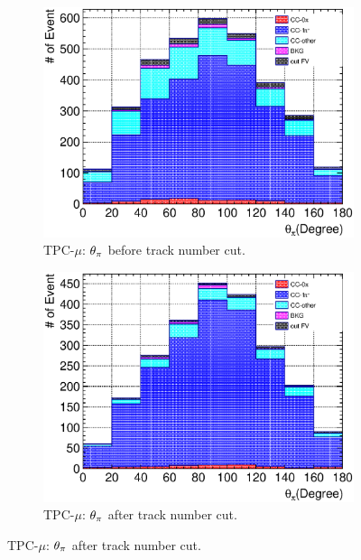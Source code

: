 \begin{figure}
\begin{subfigure}[!htb]{\dbfigwid\textwidth}
             \end{subfigure}
             \\
             \begin{subfigure}[!htb]{\dbfigwid\textwidth}
                  \includegraphics[width=\textwidth]{figures/sel/TPCmu_theta_pi_stack_al8.eps}
                  \caption{TPC-$\mu$: $\theta_{\pi}$ before track number cut.}
                  \label{subfig:tlpi-tpi-bf-trknumcut-tpc}
             \end{subfigure}
             \begin{subfigure}[!htb]{\dbfigwid\textwidth}
                  \includegraphics[width=\textwidth]{figures/sel/TPCmu_theta_pi_stack_al9.eps}
                  \caption{TPC-$\mu$: $\theta_{\pi}$ after track number cut.}

\end{subfigure}
\end{figure}

